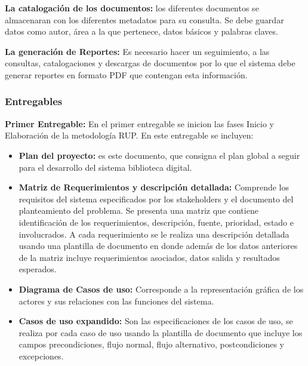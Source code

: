         \textbf{La catalogación de los documentos:} los diferentes documentos se almacenaran con 
        los diferentes metadatos para su consulta. Se debe guardar datos como autor, área a la que 
        pertenece, datos básicos y palabras claves.
        
        \textbf{La generación de Reportes:} Es necesario hacer un seguimiento, a las consultas,
        catalogaciones y descargas de documentos por lo que el sistema debe generar reportes en 
        formato PDF que contengan esta información.
        
                \subsubsection{Entregables}
                \textbf{Primer Entregable:} En el primer entregable se inicion las fases Inicio y
                Elaboración de la metodología RUP. En este entregable se incluyen:
                
                \begin{itemize}
                \item\textbf{Plan del proyecto:} es este documento, que consigna el plan global a
                seguir para el desarrollo del sistema biblioteca digital.
                \item\textbf{Matriz de Requerimientos y descripción detallada:} Comprende los
                requisitos del sistema especificados por los stakeholders y el documento del
                planteamiento del problema.
                Se presenta una matriz que contiene identificación de los requerimientos,
                descripción, fuente, prioridad, estado e involucrados. A cada requerimiento se le
                realiza una descripción detallada usando una plantilla de documento en donde además
                de los datos anteriores de la matriz incluye requerimientos asociados, datos salida
                y resultados esperados.
                \item\textbf{Diagrama de Casos de uso:} Corresponde a la representación gráfica de
                los actores y sus relaciones con las funciones del sistema.
                \item\textbf{Casos de uso expandido:} Son las especificaciones de los casos de uso,
                se realiza por cada caso de uso usando la plantilla de documento que incluye los
                campos precondiciones, flujo normal, flujo alternativo, postcondiciones y 
                excepciones.
                \end{itemize}
                
